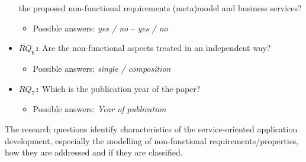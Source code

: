 \begin{itemize}
  the proposed non-functional requirements (meta)model and business services? 
\begin{itemize}
	  \item Possible answers: \textit{yes / no} -- \textit{yes / no}
	\end{itemize}  
  \item \textbf{\texttt{$RQ_6$:}} Are the non-functional aspects treated in
  an independent way?
\begin{itemize}
	  \item Possible answers: \textit{single / composition}
	\end{itemize}
\item \textbf{\texttt{$RQ_7$:}} Which is the publication year of the paper?
	\begin{itemize}
	  \item Possible answers: \textit{Year of publication}
	\end{itemize}	   
\end{itemize}



 
The research questions identify characteristics
 of the ser\-vice-oriented application development, especially the
modelling of non-functional requirements/properties, how they are addressed and
if they are classified.  
 
 

